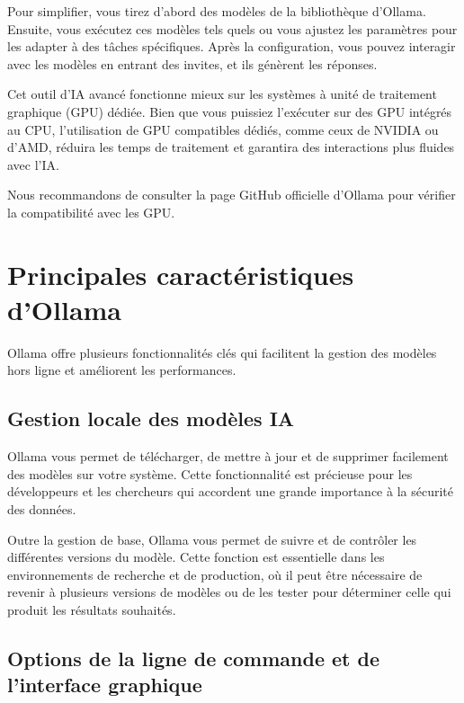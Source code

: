 \noindent
Pour simplifier, vous tirez d’abord des modèles de la bibliothèque d’Ollama. Ensuite, vous exécutez ces modèles tels quels ou vous ajustez les paramètres pour les adapter à des tâches spécifiques. Après la configuration, vous pouvez interagir avec les modèles en entrant des invites, et ils génèrent les réponses.

\medskip

\noindent
Cet outil d’IA avancé fonctionne mieux sur les systèmes à unité de traitement graphique (GPU) dédiée. Bien que vous puissiez l’exécuter sur des GPU intégrés au CPU, l’utilisation de GPU compatibles dédiés, comme ceux de NVIDIA ou d’AMD, réduira les temps de traitement et garantira des interactions plus fluides avec l’IA.

\medskip

\noindent
Nous recommandons de consulter la page GitHub officielle d’Ollama pour vérifier la compatibilité avec les GPU.

\section*{Principales caractéristiques d’Ollama}

Ollama offre plusieurs fonctionnalités clés qui facilitent la gestion des modèles hors ligne et améliorent les performances.

\subsection*{Gestion locale des modèles IA}

Ollama vous permet de télécharger, de mettre à jour et de supprimer facilement des modèles sur votre système. Cette fonctionnalité est précieuse pour les développeurs et les chercheurs qui accordent une grande importance à la sécurité des données.

\medskip

Outre la gestion de base, Ollama vous permet de suivre et de contrôler les différentes versions du modèle. Cette fonction est essentielle dans les environnements de recherche et de production, où il peut être nécessaire de revenir à plusieurs versions de modèles ou de les tester pour déterminer celle qui produit les résultats souhaités.

\subsection*{Options de la ligne de commande et de l’interface graphique}

